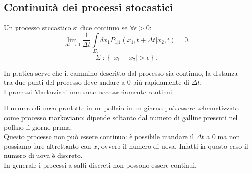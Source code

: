\subsection{Continuità dei processi stocastici}%
\label{sub:Continuità dei processi stocastici}
\begin{defn}
    Un processo stocastico si dice continuo se $\forall \epsilon > 0$: 
    \[
	\lim_{\Delta t \to 0} \frac{1}{\Delta t}\int\limits_{\Sigma_\epsilon}   dx_1 P_{1|1}(x_1, t + \Delta t | x_2, t) = 0
    .\] 
    \[
        \Sigma_\epsilon : \left\{ \left|x_1-x_2\right|>\epsilon\right\}
    .\] 
\end{defn}
\noindent
In pratica serve che il cammino descritto dal processo sia continuo, la distanza tra due punti del processo deve andare a $0$ più rapidamente di $\Delta t$.\\
I processi Markoviani non sono necessariamente continui:
\begin{exmp}[Pollaio]
    Il numero di uova prodotte in un pollaio in un giorno può essere schematizzato come processo markoviano: dipende soltanto dal numero di galline presenti nel pollaio il giorno prima.\\
    Questo processo non può essere continuo: è possibile mandare il $\Delta t$ a $0$ ma non possiamo fare altrettanto con $x$, ovvero il numero di uova. Infatti in questo caso il numero di uova è discreto. \\
    In generale i processi a salti discreti non possono essere continui.
\end{exmp}
\noindent
